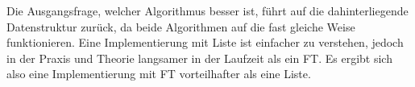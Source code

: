 Die Ausgangsfrage, welcher Algorithmus besser ist, führt auf die dahinterliegende Datenstruktur zurück, da beide Algorithmen auf die fast gleiche Weise funktionieren. Eine Implementierung mit Liste ist einfacher zu verstehen, jedoch in der Praxis und Theorie langsamer in der Laufzeit als ein FT. Es ergibt sich also eine Implementierung mit FT vorteilhafter als eine Liste.
